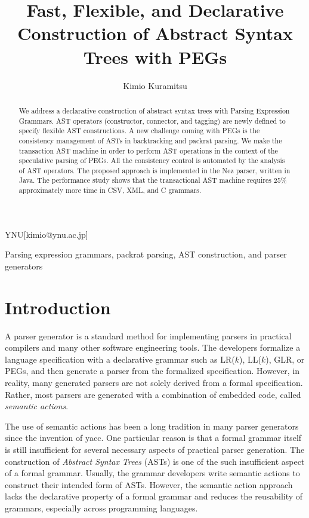 \documentclass[JIP]{ipsj}
\begin{document}
\title{Fast, Flexible, and Declarative Construction of Abstract Syntax Trees with PEGs}


\author{Kimio Kuramitsu}{YNU}[kimio@ynu.ac.jp]

\begin{abstract}
We address a declarative construction of abstract syntax trees with Parsing Expression Grammars. AST operators (constructor, connector, and tagging) are newly defined to specify flexible AST constructions. A new challenge coming with PEGs is the consistency management of ASTs in backtracking and packrat parsing. We make the transaction AST machine in order to perform AST operations in the context of the speculative parsing of PEGs. All the consistency control is automated by the analysis of AST operators. The proposed approach is implemented in the Nez parser, written in Java. The performance study shows that the transactional AST machine  requires 25\% approximately more time in CSV, XML, and C grammars.
\end{abstract}

\begin{keyword}
Parsing expression grammars, packrat parsing, AST construction, and parser generators
\end{keyword}

\maketitle



\section{Introduction}

A parser generator is a standard method for implementing parsers in practical compilers and many other software engineering tools. The developers formalize a language specification with a declarative grammar such as LR($k$), LL($k$), GLR, or PEGs\cite{POPL04_PEG}, and then generate a parser from the formalized specification. However, in reality, many generated parsers are not solely derived from a formal specification. Rather, most parsers are generated with a combination of embedded code, called {\em semantic actions}.

The use of semantic actions has been a long tradition in many parser generators since the invention of yacc\cite{Yacc}. 
One particular reason is that a formal grammar itself is still insufficient for several necessary aspects of practical parser generation. The construction of {\em Abstract Syntax Trees} (ASTs)  is one of the such insufficient aspect of a formal grammar. Usually, the grammar developers write semantic actions to construct their intended form of ASTs. However, the semantic action approach lacks the declarative property of a formal grammar and reduces the reusability of grammars, especially across programming languages.
\end{document}
